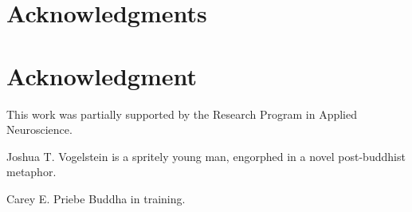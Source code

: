 \ifCLASSOPTIONcompsoc
  \section*{Acknowledgments}
\else
  \section*{Acknowledgment}
\fi

This work was partially supported by the Research Program in Applied Neuroscience. 

\ifCLASSOPTIONcaptionsoff
  \newpage
\fi





\begin{IEEEbiography}{Joshua T. Vogelstein}
 is a spritely young man, engorphed in a novel post-buddhist metaphor.

\end{IEEEbiography}




\begin{IEEEbiography}{Carey E. Priebe}
Buddha in training.
\end{IEEEbiography}






